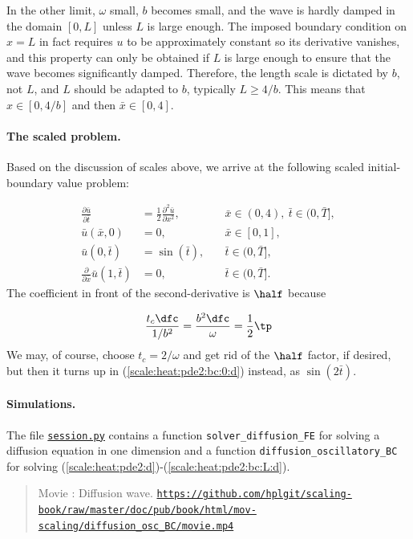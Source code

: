 \documentclass[graybox,envcountchap,sectrefs,final]{svmonodo}
\newenvironment{doconce:movie}{}{}
\newcounter{doconce:movie:counter}
\begin{document}
In the other limit, $\omega$ small, $b$ becomes small, and the wave is
hardly damped in the domain $[0,L]$ unless $L$ is large enough.  The
imposed boundary condition on $x=L$ in fact requires $u$ to be
approximately constant so its derivative vanishes, and this property
can only be obtained if $L$ is large enough to ensure that the wave
becomes significantly damped.  Therefore, the length scale is dictated
by $b$, not $L$, and $L$ should be adapted to $b$, typically $L\geq
4/b$. This means that $x\in [0,4/b]$ and then $\bar x\in [0,4]$.

\paragraph{The scaled problem.}
Based on the discussion of scales above, we arrive at the following
scaled initial-boundary value problem:

\begin{align}
\frac{\partial \bar u}{\partial \bar t} &=
\frac{1}{2}\frac{\partial^2\bar u}{\partial x^2},
\quad & \bar x\in (0,4),\ \bar t\in (0,\bar T],
\label{scale:heat:pde2:d}\\ 
\bar u(\bar x,0) &= 0,
\quad &\bar x\in [0,1],
\label{scale:heat:pde2:ic:u:d}\\ 
\bar u(0,\bar t) & = \sin(\bar t),
\quad  &\bar t\in (0,\bar T],
\label{scale:heat:pde2:bc:0:d}\\ 
\frac{\partial}{\partial\bar x}\bar u(1,\bar t) & = 0,
\quad &\bar t\in (0,\bar T].
\label{scale:heat:pde2:bc:L:d}
\end{align}
The coefficient in front of the second-derivative is $\half$ because

\[ \frac{t_c\dfc}{1/b^2} = \frac{b^2\dfc}{\omega}
= \frac{1}{2}\tp\]
We may, of course, choose $t_c=2/\omega$ and get rid of the $\half$ factor,
if desired, but then it turns up in (\ref{scale:heat:pde2:bc:0:d}) instead,
as $\sin (2\bar t)$.

\paragraph{Simulations.}
The file \href{{http://tinyurl.com/o8pb3yy/session.py}}{\nolinkurl{session.py}} contains a function
\Verb!solver_diffusion_FE! for solving a diffusion equation in one dimension
and a function \Verb!diffusion_oscillatory_BC! for solving
(\ref{scale:heat:pde2:d})-(\ref{scale:heat:pde2:bc:L:d}).


\begin{doconce:movie}
\begin{quote}
Movie : Diffusion wave. \href{https://github.com/hplgit/scaling-book/raw/master/doc/pub/book/html/mov-scaling/diffusion_osc_BC/movie.mp4}{\nolinkurl{https://github.com/hplgit/scaling-book/raw/master/doc/pub/book/html/mov-scaling/diffusion_osc_BC/movie.mp4}}
\end{quote}
\end{doconce:movie}
\end{document}
